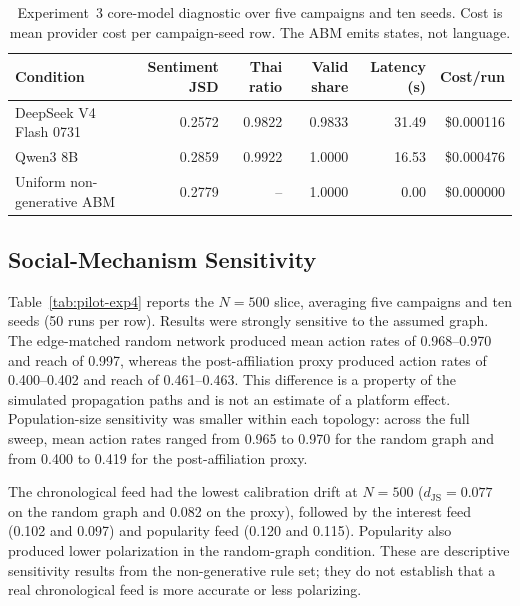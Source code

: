 \documentclass[conference]{IEEEtran}
\begin{document}
\begin{table}[t]
\caption{Experiment~3 core-model diagnostic over five campaigns and ten
seeds. Cost is mean provider cost per campaign-seed row. The ABM emits states,
not language.}
\label{tab:pilot-exp3}
\centering
\footnotesize
\begin{tabular}{@{}lrrrrr@{}}
\toprule
Condition & Sentiment JSD & Thai ratio & Valid share & Latency (s) & Cost/run \\
\midrule
DeepSeek V4 Flash 0731 & 0.2572 & 0.9822 & 0.9833 & 31.49 & \$0.000116 \\
Qwen3 8B & 0.2859 & 0.9922 & 1.0000 & 16.53 & \$0.000476 \\
Uniform non-generative ABM & 0.2779 & -- & 1.0000 & 0.00 & \$0.000000 \\
\bottomrule
\end{tabular}
\end{table}

\subsection{Social-Mechanism Sensitivity}

Table~\ref{tab:pilot-exp4} reports the $N=500$ slice, averaging five campaigns
and ten seeds (50 runs per row). Results were strongly sensitive to the assumed
graph. The edge-matched random network produced mean action rates of
0.968--0.970 and reach of 0.997, whereas the post-affiliation proxy produced
action rates of 0.400--0.402 and reach of 0.461--0.463. This difference is a
property of the simulated propagation paths and is not an estimate of a
platform effect. Population-size sensitivity was smaller within each topology:
across the full sweep, mean action rates ranged from 0.965 to 0.970 for the
random graph and from 0.400 to 0.419 for the post-affiliation proxy.

The chronological feed had the lowest calibration drift at $N=500$
($d_{\mathrm{JS}}=0.077$ on the random graph and 0.082 on the proxy), followed
by the interest feed (0.102 and 0.097) and popularity feed (0.120 and 0.115).
Popularity also produced lower polarization in the random-graph condition.
These are descriptive sensitivity results from the non-generative rule set;
they do not establish that a real chronological feed is more accurate or less
polarizing.
\end{document}
